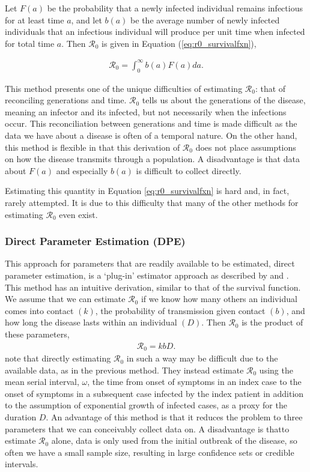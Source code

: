 \documentclass[12pt]{article}
\newcommand{\rr}{\ensuremath{\mathcal{R}_0}}
\begin{document}
Let $F(a)$ be the probability that a newly infected individual remains infectious for at least time $a$, and let $b(a)$ be the average number of newly infected individuals that an infectious individual will produce per unit time when infected for total time $a$.  Then $\rr$ is given in Equation (\ref{eq:r0_survivalfxn}),

\begin{align}\label{eq:r0_survivalfxn}
  \rr = \int_0^\infty b(a)F(a)da.
\end{align}

This method presents one of the unique difficulties of estimating $\rr$: that of reconciling generations and time.  $\rr$ tells us about the generations of the disease, meaning an infector and its infected, but not necessarily when the infections occur.  This reconciliation between generations and time is made difficult as the data we have about a disease is often of a temporal nature.  On the other hand, this method is flexible in that this derivation of $\rr$  does not place assumptions on how the disease transmits through a population.  A disadvantage is that data about $F(a)$ and especially $b(a)$ is difficult to collect directly.

Estimating this quantity in Equation \ref{eq:r0_survivalfxn} is hard and, in fact, rarely attempted. It is due to this difficulty that many of the other methods for estimating $\rr$ even exist.  



\subsubsection{Direct Parameter Estimation (DPE)}
\label{sec:dpe}

This approach for parameters that are readily available to be estimated, direct parameter estimation, is a `plug-in' estimator approach as described by \cite{lipsitch2003} and \cite{dietz1993estimation}.  This method has an intuitive derivation, similar to that of the survival function.  We assume that we can estimate $\rr$ if we know how many others an individual comes into contact $(k)$, the probability of transmission given contact $(b)$, and how long the disease lasts within an individual $(D)$.  Then $\rr$ is the product of these parameters, 
\begin{align}\label{eq:dpe}
\rr = kbD.
\end{align}
\cite{lipsitch2003} note that directly estimating $\rr$ in such a way may be difficult due to the available data, as in the previous  method.  They instead estimate $\rr$ using the mean serial interval, $\omega$, the time from onset of symptoms in an index case to the onset of symptoms in a subsequent case infected by the index patient in addition to the assumption of exponential growth of infected cases, as a proxy for the duration $D$.  An advantage of this method is that it reduces the problem to three parameters that we can conceivably collect data on.  A disadvantage is thatto estimate $\rr$ alone,  data is only used from the initial outbreak of the disease, so often we have a small sample size, resulting in large confidence sets or credible intervals.
\end{document}
